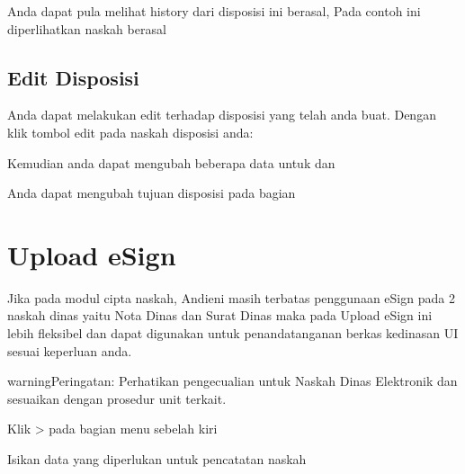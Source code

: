 \documentclass[letterpaper,10pt,bahasai]{sphinxmanual}
\begin{document}
Anda dapat pula melihat history dari disposisi ini berasal, Pada contoh ini diperlihatkan naskah berasal

\noindent{}


\section{Edit Disposisi}
\label{\detokenize{disposisi:edit-disposisi}}
Anda dapat melakukan edit terhadap disposisi yang telah anda buat. Dengan klik tombol edit pada naskah disposisi anda:

\noindent{}

Kemudian anda dapat mengubah beberapa data untuk  dan 

\noindent{}

Anda dapat mengubah tujuan disposisi pada bagian 

\noindent{}


\chapter{Upload eSign}
\label{\detokenize{upload_eSign:upload-esign}}\label{\detokenize{upload_eSign::doc}}
Jika pada modul cipta naskah, Andieni masih terbatas penggunaan eSign pada 2 naskah dinas yaitu Nota Dinas dan Surat Dinas
maka pada Upload eSign ini lebih fleksibel dan dapat digunakan untuk penandatanganan berkas kedinasan UI sesuai keperluan anda.

\begin{sphinxadmonition}{warning}{Peringatan:}
Perhatikan pengecualian untuk Naskah Dinas Elektronik dan sesuaikan dengan prosedur unit terkait.
\end{sphinxadmonition}

Klik \sphinxhyphen{}\textgreater{}  pada bagian menu sebelah kiri

Isikan data yang diperlukan untuk pencatatan naskah
\end{document}
